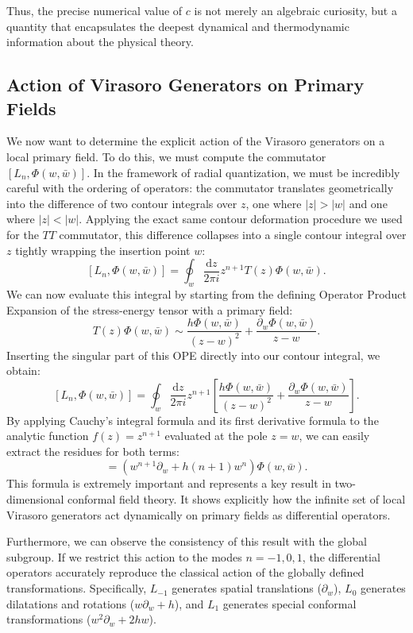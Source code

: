 Thus, the precise numerical value of \(c\) is not merely an algebraic curiosity, but a quantity that encapsulates the deepest dynamical and thermodynamic information about the physical theory.

\subsection{Action of Virasoro Generators on Primary Fields}

We now want to determine the explicit action of the Virasoro generators on a local primary field. To do this, we must compute the commutator \([L_n, \Phi(w, \bar{w})]\). In the framework of radial quantization, we must be incredibly careful with the ordering of operators: the commutator translates geometrically into the difference of two contour integrals over \(z\), one where \(|z| > |w|\) and one where \(|z| < |w|\). Applying the exact same contour deformation procedure we used for the \(TT\) commutator, this difference collapses into a single contour integral over \(z\) tightly wrapping the insertion point \(w\):
\[
    [L_n, \Phi(w, \bar{w})] = \oint_w \frac{\mathrm{d}z}{2\pi i} z^{n+1} T(z)\Phi(w, \bar{w}).
\]
We can now evaluate this integral by starting from the defining Operator Product Expansion of the stress-energy tensor with a primary field:
\[
    T(z)\Phi(w, \bar{w}) \sim \frac{h\Phi(w, \bar{w})}{(z-w)^2} + \frac{\partial_w \Phi(w, \bar{w})}{z-w}.
\]
Inserting the singular part of this OPE directly into our contour integral, we obtain:
\[
    [L_n, \Phi(w, \bar{w})] = \oint_w \frac{\mathrm{d}z}{2\pi i} z^{n+1} \left[ \frac{h\Phi(w, \bar{w})}{(z-w)^2} + \frac{\partial_w \Phi(w, \bar{w})}{z-w} \right].
\]
By applying Cauchy's integral formula and its first derivative formula to the analytic function \(f(z) = z^{n+1}\) evaluated at the pole \(z = w\), we can easily extract the residues for both terms:
\begin{equation}
    [L_n, \Phi(w, \bar{w})] = (w^{n+1}\partial_w + h(n+1)w^n)\Phi(w, \bar{w}).
    \label{eq:virasoro_primary_action}
\end{equation}
This formula is extremely important and represents a key result in two-dimensional conformal field theory. It shows explicitly how the infinite set of local Virasoro generators act dynamically on primary fields as differential operators.

Furthermore, we can observe the consistency of this result with the global subgroup. If we restrict this action to the modes \(n = -1, 0, 1\), the differential operators accurately reproduce the classical action of the globally defined transformations. Specifically, \(L_{-1}\) generates spatial translations (\(\partial_w\)), \(L_0\) generates dilatations and rotations (\(w\partial_w + h\)), and \(L_1\) generates special conformal transformations (\(w^2\partial_w + 2hw\)).